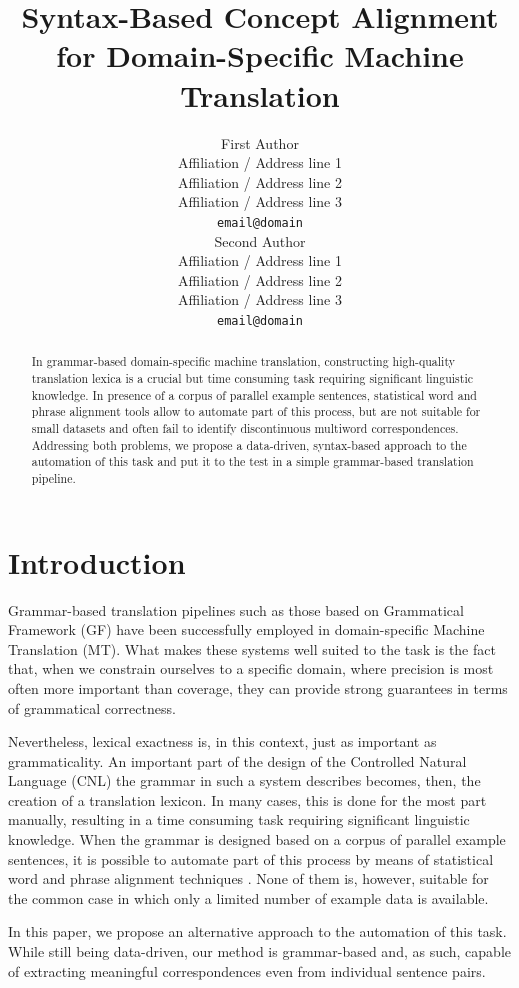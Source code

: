 \documentclass[11pt]{article}
\title{Syntax-Based Concept Alignment for Domain-Specific Machine Translation}
\author{First Author \\
  Affiliation / Address line 1 \\
  Affiliation / Address line 2 \\
  Affiliation / Address line 3 \\
  \texttt{email@domain} \\\And
  Second Author \\
  Affiliation / Address line 1 \\
  Affiliation / Address line 2 \\
  Affiliation / Address line 3 \\
  \texttt{email@domain} \\}
\begin{document}
\maketitle
\begin{abstract}
In grammar-based domain-specific machine translation, constructing high-quality translation lexica is a crucial but time consuming task requiring significant linguistic knowledge. 
In presence of a corpus of parallel example sentences, statistical word and phrase alignment tools allow to automate part of this process, but are not suitable for small datasets and often fail to identify discontinuous multiword correspondences. 
Addressing both problems, we propose a data-driven, syntax-based approach to the automation of this task and put it to the test in a simple grammar-based translation pipeline.
\end{abstract}

\section{Introduction}
Grammar-based translation pipelines such as those based on Grammatical Framework (GF) \cite{TODO:} have been successfully employed in domain-specific Machine Translation (MT). 
What makes these systems well suited to the task is the fact that, when we constrain ourselves to a specific domain, where precision is most often more important than coverage, they can provide strong guarantees in terms of grammatical correctness. 

Nevertheless, lexical exactness is, in this context, just as important as grammaticality. 
An important part of the design of the Controlled Natural Language (CNL) the grammar in such a system describes becomes, then, the creation of a translation lexicon. 
In many cases, this is done for the most part manually, resulting in a time consuming task requiring significant linguistic knowledge. 
When the grammar is designed based on a corpus of parallel example sentences, it is possible to automate part of this process by means of statistical word and phrase alignment techniques \cite{TODO: a lot}. 
None of them is, however, suitable for the common case in which only a limited number of example data is available.

In this paper, we propose an alternative approach to the automation of this task. 
While still being data-driven, our method is grammar-based and, as such, capable of extracting meaningful correspondences even from individual sentence pairs. 
\end{document}
